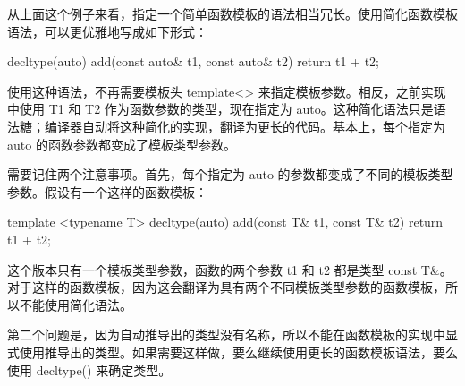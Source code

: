 从上面这个例子来看，指定一个简单函数模板的语法相当冗长。使用简化函数模板语法，可以更优雅地写成如下形式：

\begin{cpp}
decltype(auto) add(const auto& t1, const auto& t2) { return t1 + t2; }
\end{cpp}

使用这种语法，不再需要模板头 template<> 来指定模板参数。相反，之前实现中使用 T1 和 T2 作为函数参数的类型，现在指定为 auto。这种简化语法只是语法糖；编译器自动将这种简化的实现，翻译为更长的代码。基本上，每个指定为 auto 的函数参数都变成了模板类型参数。

需要记住两个注意事项。首先，每个指定为 auto 的参数都变成了不同的模板类型参数。假设有一个这样的函数模板：

\begin{cpp}
template <typename T>
decltype(auto) add(const T& t1, const T& t2) { return t1 + t2; }
\end{cpp}

这个版本只有一个模板类型参数，函数的两个参数 t1 和 t2 都是类型 const T\&。对于这样的函数模板，因为这会翻译为具有两个不同模板类型参数的函数模板，所以不能使用简化语法。

第二个问题是，因为自动推导出的类型没有名称，所以不能在函数模板的实现中显式使用推导出的类型。如果需要这样做，要么继续使用更长的函数模板语法，要么使用 decltype() 来确定类型。






















